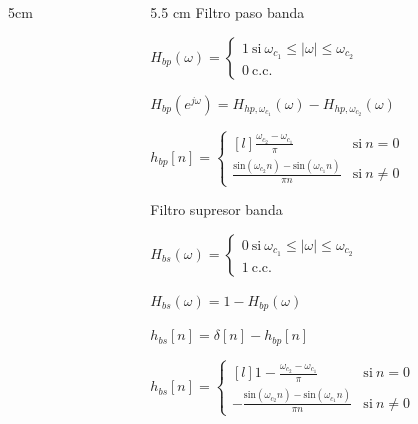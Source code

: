 \documentclass[handout]{beamer}
\numberwithin{section}{part}
\begin{document}
\begin{frame}
\begin{columns}[T]
\begin{column}{5cm}
  \end{column}
    \begin{column}{5.5 cm}
    \scriptsize\centering
    \alert{Filtro paso banda}

    \vspace{0.1cm}
    $H_{bp}(\omega)=\begin{cases}1~\mathrm{si}~\omega_{c_1}\leq|\omega|\leq\omega_{c_2}\\0~\mathrm{c.c.}\end{cases}$

    \vspace{0.1cm}
    \color{gray}
    $H_{bp}(e^{j\omega})=H_{hp,\omega_{c_1}}(\omega)-H_{hp,\omega_{c_2}}(\omega)$
    \color{black}

    \vspace{0.1cm}
    $h_{bp}[n]=\left\{\begin{matrix*}[l]
      \frac{\omega_{c_2} - \omega_{c_1}}{\pi} & \mathrm{si}~n=0\\
      \frac{\mathrm{sin}(\omega_{c_2} n) - \mathrm{sin}(\omega_{c_1} n)}{\pi n} & \mathrm{si}~n\neq 0
    \end{matrix*}\right.$
    
    \vspace{0.1cm}    
    \alert{Filtro supresor banda}

    \vspace{0.1cm}
    $H_{bs}(\omega)=\begin{cases}0~\mathrm{si}~\omega_{c_1}\leq|\omega|\leq\omega_{c_2}\\1~\mathrm{c.c.}\end{cases}$

    \vspace{0.1cm}
    \color{gray}
    $H_{bs}(\omega)=1 - H_{bp}(\omega)$

    \vspace{0.1cm}
    $h_{bs}[n]=\delta[n] - h_{bp}[n]$
    \color{black}

    \vspace{0.1cm}
    $h_{bs}[n]=\left\{\begin{matrix*}[l]
      1 - \frac{\omega_{c_2} - \omega_{c_1}}{\pi} & \mathrm{si}~n=0\\
      -\frac{\mathrm{sin}(\omega_{c_2} n) - \mathrm{sin}(\omega_{c_1} n)}{\pi n} & \mathrm{si}~n\neq 0
    \end{matrix*}\right.$
    
    \end{column}
  \end{columns}
\end{frame}
\end{document}
